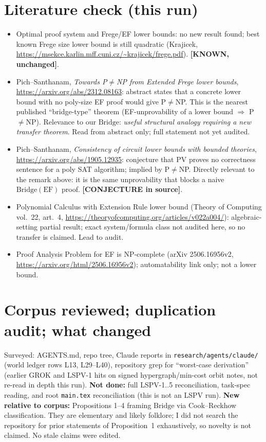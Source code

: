 \documentclass[11pt]{article}
\theoremstyle{remark}
\newcommand{\Bridge}{\mathrm{Bridge}}
\newcommand{\status}[1]{\textbf{[#1]}}
\begin{document}
\section{Literature check (this run)}
\begin{itemize}
\item Optimal proof system and Frege/EF lower bounds: no new result found; best known Frege size lower bound is still quadratic (Krajicek, \url{https://msekce.karlin.mff.cuni.cz/~krajicek/frege.pdf}). \status{KNOWN, unchanged}.
\item Pich--Santhanam, \emph{Towards P$\ne$NP from Extended Frege lower bounds}, \url{https://arxiv.org/abs/2312.08163}: abstract states that a concrete lower bound with no poly-size EF proof would give P$\ne$NP. This is the nearest published ``bridge-type'' theorem (EF-unprovability of a lower bound $\Rightarrow$ P$\ne$NP). Relevance to our $\Bridge$: \emph{useful structural analogy requiring a new transfer theorem}. Read from abstract only; full statement not yet audited.
\item Pich--Santhanam, \emph{Consistency of circuit lower bounds with bounded theories}, \url{https://arxiv.org/abs/1905.12935}: conjecture that PV proves no correctness sentence for a poly SAT algorithm; implied by P$\ne$NP. Directly relevant to the remark above: it is the same unprovability that blocks a naive $\Bridge(\mathrm{EF})$ proof. \status{CONJECTURE in source}.
\item Polynomial Calculus with Extension Rule lower bound (Theory of Computing vol.\ 22, art.\ 4, \url{https://theoryofcomputing.org/articles/v022a004/}): algebraic-setting partial result; exact system/formula class not audited here, so no transfer is claimed. Lead to audit.
\item Proof Analysis Problem for EF is NP-complete (arXiv 2506.16956v2, \url{https://arxiv.org/html/2506.16956v2}); automatability link only; not a lower bound.
\end{itemize}

\section{Corpus reviewed; duplication audit; what changed}
Surveyed: AGENTS.md, repo tree, Claude reports in \texttt{research/agents/claude/} (world ledger rows L13, L29--L40), repository grep for ``worst-case derivation'' (earlier GROK and LSPV-1 hits on signed hypergraph/min-cost orbit notes, not re-read in depth this run).
\textbf{Not done:} full LSPV-1..5 reconciliation, task-spec reading, and root \texttt{main.tex} reconciliation (this is not an LSPV run).
\textbf{New relative to corpus:} Propositions 1--4 framing $\Bridge$ via Cook--Reckhow classification. They are elementary and likely folklore; I did not search the repository for prior statements of Proposition~1 exhaustively, so novelty is not claimed.
No stale claims were edited.
\end{document}
